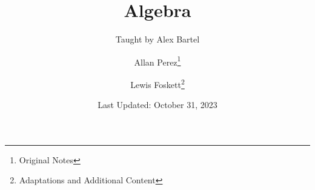 \documentclass[11pt]{scrartcl}
\title{Algebra}
\subtitle{Taught by Alex Bartel}
\author{Allan Perez\thanks{Original Notes} \and Lewis Foskett\thanks{Adaptations and Additional Content}}
\date{Last Updated: October 31, 2023}
\begin{document}
 \maketitle
 

\tableofcontents
\newpage
\listoftheorems
\newpage

































\end{document}
